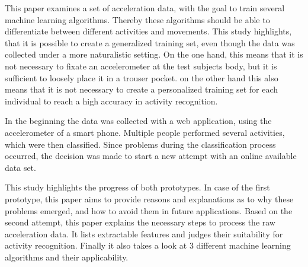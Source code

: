 
This paper examines a set of acceleration data, with the goal to train several machine learning algorithms. Thereby these algorithms should be able to differentiate between different activities and movements. This study highlights, that it is possible to create a generalized training set, even though the data was collected under a more naturalistic setting. On the one hand, this means that it is not necessary to fixate an accelerometer at the test subjects body, but it is sufficient to loosely place it in a trouser pocket. on the other hand this also means that it is not necessary to create a personalized training set for each individual to reach a high accuracy in activity recognition.

In the beginning the data was collected with a web application, using the accelerometer of a smart phone. Multiple people performed several activities, which were then classified. Since problems during the classification process occurred, the decision was made to start a new attempt with an online available data set.

This study highlights the progress of both prototypes. In case of the first prototype, this paper aims to provide reasons and explanations as to why these problems emerged, and how to avoid them in future applications. Based on the second attempt, this paper explains the necessary steps to process the raw acceleration data. It lists extractable features and judges their suitability for activity recognition. Finally it also takes a look at 3 different machine learning algorithms and their applicability.